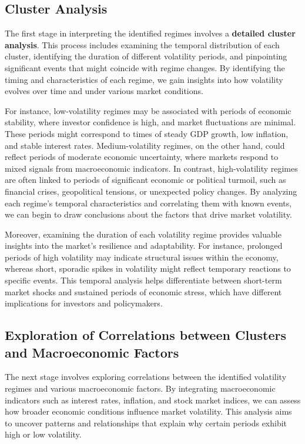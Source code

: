 \subsection{Cluster Analysis}

The first stage in interpreting the identified regimes involves a \textbf{detailed cluster analysis}. This process includes examining the temporal distribution of each cluster, identifying the duration of different volatility periods, and pinpointing significant events that might coincide with regime changes. By identifying the timing and characteristics of each regime, we gain insights into how volatility evolves over time and under various market conditions.

For instance, low-volatility regimes may be associated with periods of economic stability, where investor confidence is high, and market fluctuations are minimal. These periods might correspond to times of steady GDP growth, low inflation, and stable interest rates. Medium-volatility regimes, on the other hand, could reflect periods of moderate economic uncertainty, where markets respond to mixed signals from macroeconomic indicators. In contrast, high-volatility regimes are often linked to periods of significant economic or political turmoil, such as financial crises, geopolitical tensions, or unexpected policy changes. By analyzing each regime’s temporal characteristics and correlating them with known events, we can begin to draw conclusions about the factors that drive market volatility.

Moreover, examining the duration of each volatility regime provides valuable insights into the market’s resilience and adaptability. For instance, prolonged periods of high volatility may indicate structural issues within the economy, whereas short, sporadic spikes in volatility might reflect temporary reactions to specific events. This temporal analysis helps differentiate between short-term market shocks and sustained periods of economic stress, which have different implications for investors and policymakers.

\subsection{Exploration of Correlations between Clusters and Macroeconomic Factors}

The next stage involves exploring correlations between the identified volatility regimes and various macroeconomic factors. By integrating macroeconomic indicators such as interest rates, inflation, and stock market indices, we can assess how broader economic conditions influence market volatility. This analysis aims to uncover patterns and relationships that explain why certain periods exhibit high or low volatility.

